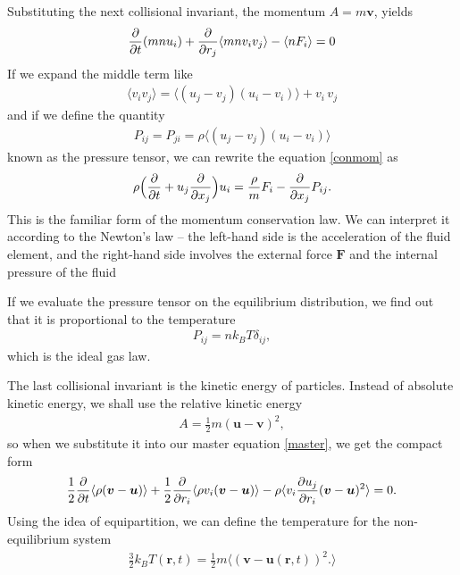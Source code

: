 Substituting the next collisional invariant, the momentum $A=m\bm{v}$, yields
\begin{align} \label{conmom}
\frac{\partial}{\partial t} (mn u_i)  + \frac{\partial}{\partial r_j}\langle mn v_i v_j \rangle - \langle n F_i \rangle = 0
\end{align}
If we expand the middle term like
\begin{align*}
\langle v_i v_j \rangle = \langle (u_j - v_j) (u_i - v_i) \rangle + v_i\, v_j
\end{align*}
and if we define the quantity
\begin{align*}
P_{ij} = P_{ji} = \rho \langle (u_j - v_j) (u_i - v_i) \rangle
\end{align*}
known as the pressure tensor,
we can rewrite the equation \ref{conmom} as
\begin{align} \label{mmcl}
\rho \Big(\frac{\partial}{\partial t} + u_j \frac{\partial}{\partial x_j} \Big) u_i = \frac{\rho}{m} F_i - \frac{\partial}{\partial x_j}P_{ij}.
\end{align}
This is the familiar form of the momentum conservation law. We can interpret it according to the Newton's law -- the left-hand side is the acceleration of the fluid element, and the right-hand side involves the external force $\bm{F}$ and the internal pressure of the fluid

If we evaluate the pressure tensor on the equilibrium distribution, we find out that it is proportional to the temperature
\begin{align*}
P_{ij} = n k_B T \delta_{ij},
\end{align*} 
which is the ideal gas law.

\bigskip

The last collisional invariant is the kinetic energy of particles.
Instead of absolute kinetic energy, we shall use the relative kinetic energy
\begin{align*}
A  = \frac{1}{2} m (\bm{u} - \bm{v})^2,
\end{align*}
so when we substitute it into our master equation \ref{master}, we get the compact form
\begin{align} \label{cone}
\frac{1}{2} \frac{\partial}{\partial t} \langle \rho(\bm{v} - \bm{u}) \rangle + \frac{1}{2} \frac{\partial}{\partial r_i} \langle \rho v_i (\bm{v} - \bm{u}) \rangle - \rho \langle v_i \frac{\partial u_j}{\partial r_i}(\bm{v} - \bm{u})^2 \rangle = 0.
\end{align}
Using the idea of equipartition, we can define the temperature for the non-equilibrium system
\begin{align*}
\frac{3}{2}k_B T(\bm{r},t) = \frac{1}{2} m \langle (\bm{v} - \bm{u}(\bm{r},t))^2. \rangle
\end{align*}

